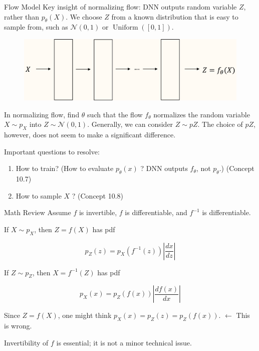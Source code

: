 \begin{frame}[allowframebreaks]

\begin{mydefinitionblock}{10.5}{Flow Model}
    Key insight of normalizing flow: DNN outputs random variable $Z$, rather than $p_{\theta}(X)$.
    We choose \( Z \) from a known distribution that is easy to sample from, such as \( \mathcal{N}(0,1) \) or \( \operatorname{Uniform}([0,1]) \).

    \begin{figure}[H]
        \centering
        \includegraphics[width=1.0\textwidth]{.././assets/10.6.png}
    \end{figure}

    In normalizing flow, find $\theta$ such that the flow $f_{\theta}$ normalizes the random variable $X \sim p_{X}$ into $Z \sim \mathcal{N}(0,1)$.
    Generally, we can consider $Z \sim pZ$. The choice of $pZ$, however, does not seem to make a significant difference.

    Important questions to resolve:

    \begin{enumerate}
        \item How to train? (How to evaluate $p_{\theta}(x)$ ? DNN outputs $f_{\theta}$, not $p_{\theta}$.) (Concept 10.7)
        \item How to sample $X$ ? (Concept 10.8)
    \end{enumerate}
\end{mydefinitionblock}

\end{frame}

\begin{frame}[allowframebreaks]

\begin{myconceptblock}{10.6}{Math Review}
    Assume $f$ is invertible, $f$ is differentiable, and $f^{-1}$ is differentiable.

    If $X \sim p_{X}$, then $Z=f(X)$ has pdf

    $$
    p_{Z}(z)=p_{X}\left(f^{-1}(z)\right)\left|\frac{d x}{d z}\right|
    $$

    If $Z \sim p_{Z}$, then $X=f^{-1}(Z)$ has pdf

    $$
    p_{X}(x)=p_{Z}(f(x))\left|\frac{d f(x)}{d x}\right|
    $$

    Since $Z=f(X)$, one might think $p_{X}(x)=p_{Z}(z)=p_{Z}(f(x))$. $\leftarrow$ This is wrong.

    Invertibility of $f$ is essential; it is not a minor technical issue.
\end{myconceptblock}

\end{frame}

